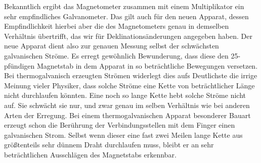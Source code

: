 Bekanntlich ergibt das Magnetometer zusammen mit einem Multiplikator ein sehr empfindliches Galvanometer. Das gilt auch für den neuen Apparat, dessen Empfindlichkeit hierbei aber die des Magnetometers genau in demselben Verhältnis übertrifft, das wir für Deklinationsänderungen angegeben haben. Der neue Apparat dient also zur genauen Messung selbst der schwächsten galvanischen Ströme. Es erregt gewöhnlich Bewunderung, dass diese den 25-pfündigen Magnetstab in dem Apparat in so beträchtliche Bewegungen versetzen. Bei thermogalvanisch erzeugten Strömen widerlegt dies aufs Deutlichste die irrige Meinung vieler Physiker, dass solche Ströme eine Kette von beträchtlicher Länge nicht durchlaufen könnten. Eine noch so lange Kette hebt solche Ströme nicht auf. Sie schwächt sie nur, und zwar genau im selben Verhältnis wie bei anderen Arten der Erregung. Bei einem thermogalvanischen Apparat besonderer Bauart erzeugt schon die Berührung der Verbindungsstellen mit dem Finger einen galvanischen Strom. Selbst wenn dieser eine fast zwei Meilen lange Kette aus größtenteils sehr dünnem Draht durchlaufen muss, bleibt er an sehr beträchtlichen Ausschlägen des Magnetstabs erkennbar.


